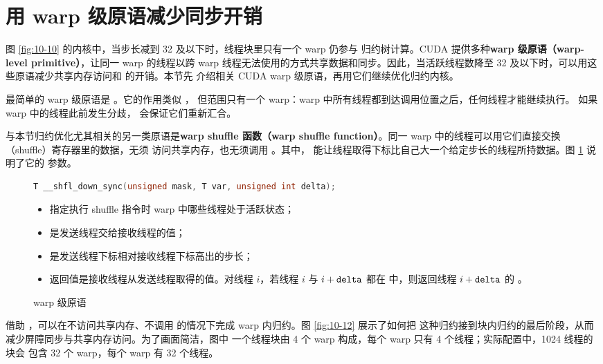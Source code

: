 \section{用 warp 级原语减少同步开销}
\label{sec:reduction-warp-primitives}

图 \ref{fig:10-10} 的内核中，当步长减到 32 及以下时，线程块里只有一个 warp 仍参与
归约树计算。CUDA 提供多种\textbf{warp 级原语（warp-level primitive）}，让同一
warp 的线程以跨 warp 线程无法使用的方式共享数据和同步。因此，当活跃线程数降至 32
及以下时，可以用这些原语减少共享内存访问和  的开销。本节先
介绍相关 CUDA warp 级原语，再用它们继续优化归约内核。

最简单的 warp 级原语是 。它的作用类似 ，
但范围只有一个 warp：warp 中所有线程都到达调用位置之后，任何线程才能继续执行。
如果 warp 中的线程此前发生分歧， 会保证它们重新汇合。

与本节归约优化尤其相关的另一类原语是\textbf{warp shuffle 函数（warp shuffle
function）}。同一 warp 中的线程可以用它们直接交换（shuffle）寄存器里的数据，无须
访问共享内存，也无须调用 。其中，
能让线程取得下标比自己大一个给定步长的线程所持数据。图 \ref{fig:10-11} 说明了它的
参数。

\begin{figure}[htbp]
  \centering
  \begin{minipage}{0.90\textwidth}
  \begin{lstlisting}[language=C++,numbers=none]
T __shfl_down_sync(unsigned mask, T var, unsigned int delta);
  \end{lstlisting}
  \begin{itemize}
    \item {} 指定执行 shuffle 指令时 warp 中哪些线程处于活跃状态；
    \item {} 是发送线程交给接收线程的值；
    \item {} 是发送线程下标相对接收线程下标高出的步长；
    \item 返回值是接收线程从发送线程取得的值。对线程 $i$，若线程 $i$ 与
    $i+\code{delta}$ 都在  中，则返回线程 $i+\code{delta}$ 的
    。
  \end{itemize}
  \end{minipage}
  \caption{warp 级原语 }
  \label{fig:10-11}
\end{figure}

借助 ，可以在不访问共享内存、不调用
 的情况下完成 warp 内归约。图 \ref{fig:10-12} 展示了如何把
这种归约接到块内归约的最后阶段，从而减少屏障同步与共享内存访问。为了画面简洁，图中
一个线程块由 4 个 warp 构成，每个 warp 只有 4 个线程；实际配置中，1024 线程的块会
包含 32 个 warp，每个 warp 有 32 个线程。

